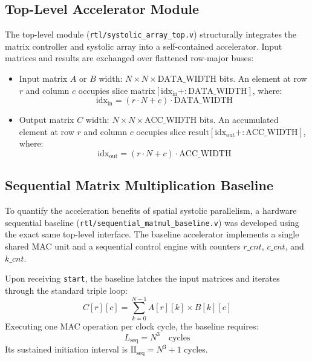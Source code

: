 \documentclass[conference]{IEEEtran}
\begin{document}
\subsection{Top-Level Accelerator Module}
The top-level module (\texttt{rtl/systolic\_array\_top.v}) structurally integrates the matrix controller and systolic array into a self-contained accelerator. Input matrices and results are exchanged over flattened row-major buses:
\begin{itemize}
    \item Input matrix $A$ or $B$ width: $N \times N \times \text{DATA\_WIDTH}$ bits. An element at row $r$ and column $c$ occupies slice $\text{matrix}[\text{idx}_{\text{in}} +: \text{DATA\_WIDTH}]$, where:
    \begin{equation}
    \text{idx}_{\text{in}} = (r \cdot N + c) \cdot \text{DATA\_WIDTH}
    \end{equation}
    \item Output matrix $C$ width: $N \times N \times \text{ACC\_WIDTH}$ bits. An accumulated element at row $r$ and column $c$ occupies slice $\text{result}[\text{idx}_{\text{out}} +: \text{ACC\_WIDTH}]$, where:
    \begin{equation}
    \text{idx}_{\text{out}} = (r \cdot N + c) \cdot \text{ACC\_WIDTH}
    \end{equation}
\end{itemize}

\subsection{Sequential Matrix Multiplication Baseline}
To quantify the acceleration benefits of spatial systolic parallelism, a hardware sequential baseline (\texttt{rtl/sequential\_matmul\_baseline.v}) was developed using the exact same top-level interface. The baseline accelerator implements a single shared MAC unit and a sequential control engine with counters $r\_cnt$, $c\_cnt$, and $k\_cnt$.

Upon receiving \texttt{start}, the baseline latches the input matrices and iterates through the standard triple loop:
\begin{equation}
C[r][c] = \sum_{k=0}^{N-1} A[r][k] \times B[k][c]
\end{equation}
Executing one MAC operation per clock cycle, the baseline requires:
\begin{equation}
L_{\text{seq}} = N^3 \quad \text{cycles}
\end{equation}
Its sustained initiation interval is $\text{II}_{\text{seq}} = N^3 + 1$ cycles.
\end{document}
